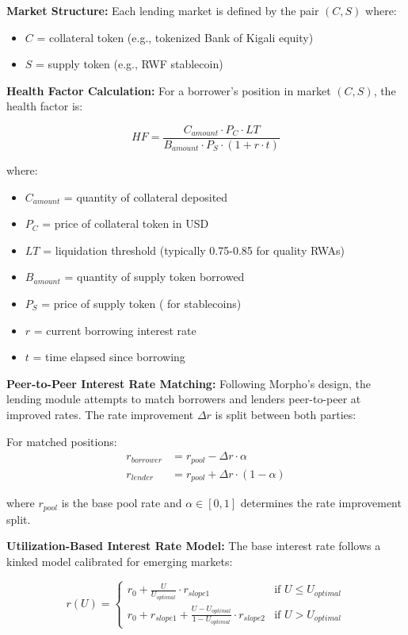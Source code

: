 \documentclass[12pt]{article}
\begin{document}
\textbf{Market Structure:}
Each lending market is defined by the pair $(C, S)$ where:
\begin{itemize}
\item $C$ = collateral token (e.g., tokenized Bank of Kigali equity)
\item $S$ = supply token (e.g., RWF stablecoin)
\end{itemize}

\textbf{Health Factor Calculation:}
For a borrower's position in market $(C, S)$, the health factor is:

\begin{equation}
HF = \frac{C_{amount} \cdot P_C \cdot LT}{B_{amount} \cdot P_S \cdot (1 + r \cdot t)}
\end{equation}

where:
\begin{itemize}
\item $C_{amount}$ = quantity of collateral deposited
\item $P_C$ = price of collateral token in USD
\item $LT$ = liquidation threshold (typically 0.75-0.85 for quality RWAs)
\item $B_{amount}$ = quantity of supply token borrowed
\item $P_S$ = price of supply token ( for stablecoins)
\item $r$ = current borrowing interest rate
\item $t$ = time elapsed since borrowing
\end{itemize}

\textbf{Peer-to-Peer Interest Rate Matching:}
Following Morpho's design, the lending module attempts to match borrowers and lenders peer-to-peer at improved rates. The rate improvement $\Delta r$ is split between both parties:

For matched positions:
\begin{align}
r_{borrower} &= r_{pool} - \Delta r \cdot \alpha \\
r_{lender} &= r_{pool} + \Delta r \cdot (1 - \alpha)
\end{align}

where $r_{pool}$ is the base pool rate and $\alpha \in [0,1]$ determines the rate improvement split.

\textbf{Utilization-Based Interest Rate Model:}
The base interest rate follows a kinked model calibrated for emerging markets:

\begin{equation}
r(U) = \begin{cases}
r_0 + \frac{U}{U_{optimal}} \cdot r_{slope1} & \text{if } U \leq U_{optimal} \\
r_0 + r_{slope1} + \frac{U - U_{optimal}}{1 - U_{optimal}} \cdot r_{slope2} & \text{if } U > U_{optimal}
\end{cases}
\end{equation}
\end{document}
